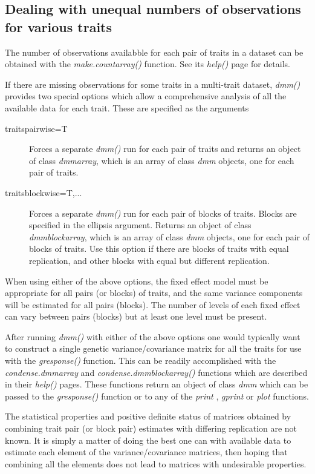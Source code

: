 \documentclass[titlepage]{article}  %
\begin{document}
\subsection{Dealing with unequal numbers of observations for various traits}
The number of observations availabble for each pair of traits in a dataset can be obtained with the {\em make.countarray()} function. See its {\em help()} page for details.

If there are missing observations for some traits in a multi-trait dataset, {\em dmm()} provides two special options which allow a comprehensive analysis of all the available data for each trait. These are specified as the arguments

\begin{description}
\item[traitspairwise=T] Forces a separate {\em dmm()} run for each pair of traits and returns an object of class {\em dmmarray}, which is an array of class {\em dmm} objects, one for each pair of traits.
\item[traitsblockwise=T,...] Forces a separate {\em dmm()} run for each pair of blocks of traits. Blocks are specified in the ellipsis argument. Returns an object of class {\em dmmblockarray}, which is an array of class {\em dmm} objects, one for each pair of blocks of traits. Use this option if there are blocks of traits with equal replication, and other blocks with equal but different replication.
\end{description}

When using either of the above options, the fixed effect model must be appropriate for all pairs (or blocks) of traits, and the same variance components will be estimated for all pairs (blocks).  The number of levels of each fixed effect can vary between pairs (blocks) but at least one level must be present.

After running {\em dmm()} with either of the above options one would typically want to construct a single genetic variance/covariance matrix for all the traits for use with the {\em gresponse()} function. This can be readily accomplished with the {\em condense.dmmarray} and {\em condense.dmmblockarray()} functions which are described in their {\em help()} pages. These functions return an object of class {\em dmm}  which  can be passed to the {\em gresponse()} function or to any of the {\em print} , {\em gprint}  or {\em plot} functions.

The statistical properties and positive definite status of matrices obtained by combining trait pair (or block pair) estimates with differing replication are not known. It is simply a matter of doing the best one can with available data to estimate each element of the variance/covariance matrices, then hoping that combining all the elements does not lead to  matrices with undesirable properties.
\end{document}
